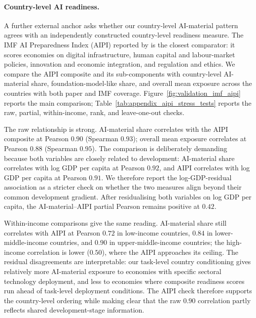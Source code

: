 \documentclass[11pt]{article}
\begin{document}



\paragraph{Country-level AI readiness.} A further external anchor asks whether our country-level AI-material pattern agrees with an independently constructed country-level readiness measure. The IMF AI Preparedness Index (AIPI) reported by \citet{CazzanigaEtAl2024GenAI} is the closest comparator: it scores economies on digital infrastructure, human capital and labour-market policies, innovation and economic integration, and regulation and ethics. We compare the AIPI composite and its sub-components with country-level AI-material share, foundation-model-like share, and overall mean exposure across the countries with both paper and IMF coverage. Figure~\ref{fig:validation_imf_aipi} reports the main comparison; Table~\ref{tab:appendix_aipi_stress_tests} reports the raw, partial, within-income, rank, and leave-one-out checks.

The raw relationship is strong. AI-material share correlates with the AIPI composite at Pearson $0.90$ (Spearman $0.93$); overall mean exposure correlates at Pearson $0.88$ (Spearman $0.95$). The comparison is deliberately demanding because both variables are closely related to development: AI-material share correlates with log GDP per capita at Pearson $0.92$, and AIPI correlates with log GDP per capita at Pearson $0.91$. We therefore report the log-GDP-residual association as a stricter check on whether the two measures align beyond their common development gradient. After residualising both variables on log GDP per capita, the AI-material--AIPI partial Pearson remains positive at $0.42$.


Within-income comparisons give the same reading. AI-material share still correlates with AIPI at Pearson $0.72$ in low-income countries, $0.84$ in lower-middle-income countries, and $0.90$ in upper-middle-income countries; the high-income correlation is lower ($0.50$), where the AIPI approaches its ceiling. The residual disagreements are interpretable: our task-level country conditioning gives relatively more AI-material exposure to economies with specific sectoral technology deployment, and less to economies where composite readiness scores run ahead of task-level deployment conditions. The AIPI check therefore supports the country-level ordering while making clear that the raw $0.90$ correlation partly reflects shared development-stage information.
\end{document}

